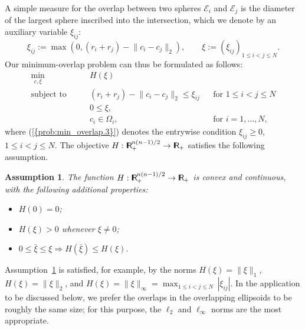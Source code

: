 \documentclass{siamltex}
\newtheorem{assumption}{Assumption}
\providecommand{\norm}[1]{\lVert#1\rVert}
\begin{document}
A simple measure for the overlap between two spheres $\mathcal{E}_i$
and $\mathcal{E}_j$ is the diameter of the largest sphere inscribed
into the intersection, which we denote by an auxiliary variable $\xi_{ij}$:
\begin{equation} \label{eq:defxi} 
\xi_{ij} := \max (0, (r_i
+r_j)-\norm{c_i-c_j}_2), \qquad \xi := (\xi_{ij})_{1 \le i < j \le N}.
\end{equation}
Our minimum-overlap problem can thus be formulated as follows:
\begin{subequations}
\label{prob:min_overlap}
\begin{align}
\min_{c,\xi} \qquad&
H(\xi) 
\label{prob:min_overlap.1}
\\
\mbox{subject to} \qquad &
(r_i + r_j) - \norm{c_i - c_j}_2 \leq \xi_{ij}
&& \mbox{for }  1\leq i< j \leq N  
\label{prob:min_overlap.2}
\\
& 0 \leq \xi, 
\label{prob:min_overlap.3}
\\
& c_i \in \Omega_i, && 
\mbox{for }  i = 1,\dots , N,  
\label{prob:min_overlap.4}
\end{align}
\end{subequations}
where {(\ref{{prob:min_overlap.3}})} denotes the entrywise condition
$\xi_{ij} \ge 0$, $1 \le i < j \le N$.  The objective $H:
{\makebox{\sf I \hspace{-8.5 pt} R \hspace{-4.0pt}}}^{n(n-1)/2}_+ \to {\makebox{\sf I \hspace{-8.5 pt} R \hspace{-4.0pt}}}_+$ satisfies the following assumption.
\begin{assumption} \label{ass:H} The function $H: {\makebox{\sf I \hspace{-8.5 pt} R \hspace{-4.0pt}}}^{n(n-1)/2}_+ \to
  {\makebox{\sf I \hspace{-8.5 pt} R \hspace{-4.0pt}}}_+$ is convex and continuous, with the following additional
  properties:
\begin{itemize}
\item[(a)] $H(0)=0$;
\item[(b)]  $H(\xi)>0$ whenever $\xi \neq 0$;
\item[(c)] $0 \le \bar{\xi} \le \xi \Rightarrow H(\bar{\xi}) \le H(\xi)$.
\end{itemize}
\end{assumption}

Assumption~\ref{ass:H} is satisfied, for example, by the norms
$H(\xi)=\|\xi\|_1$, $H(\xi)=\|\xi\|_2$, and $H(\xi) = \|
\xi\|_{\infty} = \max_{1 \le i < j \le N} \, |\xi_{ij}|$. In the
application to be discussed below, we prefer the overlaps in the
overlapping ellipsoids to be roughly the same size; for this purpose,
the $\ell_2$ and $\ell_{\infty}$ norms are the most appropriate. 
\end{document}
